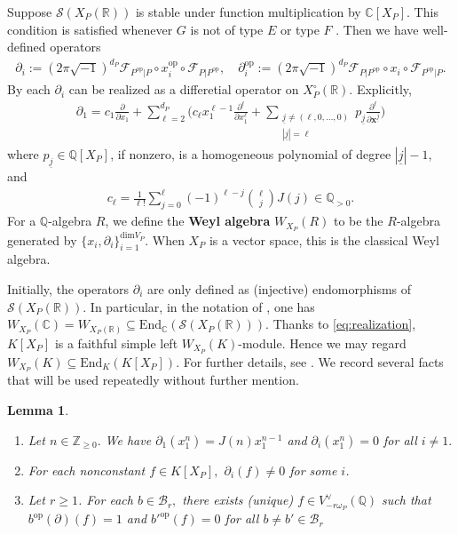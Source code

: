 \documentclass[11pt,a4paper,usenames,dvipsnames,reqno]{amsart}
\numberwithin{equation}{section}
\newcommand{\cc}{\mathbb C}
\newcommand{\zz}{\mathbb Z}
\newcommand{\qq}{\mathbb Q}
\newcommand{\rr}{\mathbb R}
\newtheorem{Lem}[Thm]{Lemma}
\theoremstyle{definition}
\theoremstyle{remark}
\begin{document}
Suppose $\mathcal{S}(X_P(\rr))$ is stable under function multiplication by $\cc[X_P].$ This condition is satisfied whenever $G$ is not of type $E$ or type $F$ \cite[Proposition 7.2]{Hsu:asymptotics}. Then we have well-defined operators
\begin{align*}
    \partial_i:=(2\pi\sqrt{-1})^{d_P}\mathcal{F}_{P^{\mathrm{op}}|P}\circ x_i^{\mathrm{op}}\circ\mathcal{F}_{P|P^{\mathrm{op}}},\quad \partial_i^{\mathrm{op}}:=(2\pi\sqrt{-1})^{d_P}\mathcal{F}_{P|P^{\mathrm{op}}}\circ x_i\circ\mathcal{F}_{P^{\mathrm{op}}|P}.
\end{align*}
By \cite[Theorem 7.8]{Hsu:asymptotics} each $\partial_i$ can be realized as a differetial operator on $X_P^\circ(\rr).$ Explicitly, 
\begin{align}\label{eq:realization}
    \partial_1=c_1\frac{\partial}{\partial x_1}+\sum_{\ell=2}^{d_P} \bigg( c_\ell x_1^{\ell-1}\frac{\partial^\ell}{\partial x_1^\ell}+\sum_{\substack{\underline{j}\neq (\ell,0,\ldots,0)\\|\underline{j}|=\ell} } p_{\underline{j}} \frac{\partial^\ell}{\partial \mathbf{x}^{\underline{j}}}\bigg)
\end{align}
where $p_{\underline{j}}\in \qq[X_P]$, if nonzero, is a homogeneous polynomial of degree $|\underline{j}|-1$, and 
\begin{align*}
    c_\ell=\frac{1}{\ell!}\sum_{j=0}^{\ell} (-1)^{\ell-j}\binom{\ell}{j}J(j)\in \qq_{>0}.
\end{align*}
For a $\qq$-algebra $R$, we define the \textbf{Weyl algebra} $W_{X_P}(R)$ to be the $R$-algebra generated by $\{x_i,\partial_i\}_{i=1}^{\mathrm{dim} V_P}$. When $X_P$ is a vector space, this is the classical Weyl algebra. 

Initially, the operators $\partial_i$ are only defined as (injective) endomorphisms of $\mathcal{S}(X_P(\rr))$. In particular, in the notation of \cite{Hsu:asymptotics}, one has $W_{X_P}(\cc)=W_{X_P(\rr)}\subseteq \mathrm{End}_\cc(\mathcal{S}(X_P(\rr)))$. Thanks to \eqref{eq:realization}, $K[X_P]$ is a faithful simple left $W_{X_P}(K)$-module. Hence we may regard $W_{X_P}(K)\subseteq \mathrm{End}_K(K[X_P])$. For further details, see \cite[\S 7.2]{Hsu:asymptotics}. We record several facts that will be used repeatedly without further mention.

\begin{Lem}
    \begin{enumerate}
        \item Let $n\in \zz_{\ge 0}.$ We have $\partial_1(x_1^n)=J(n)x_1^{n-1}$ and $\partial_i(x_1^n)=0$ for all $i\neq 1.$
        \item For each nonconstant $f\in K[X_P],$ $\partial_i(f)\neq 0$ for some $i$.
        \item Let $r\ge 1$. For each $b\in \mathcal{B}_r,$ there exists (unique) $f\in V_{-r\omega_P}^\lor(\qq)$ such that $b^{\mathrm{op}}(\partial)(f)=1$ and $b'^{\mathrm{op}}(f)=0$ for all $b\neq b'\in \mathcal{B}_r$
    \end{enumerate}
\end{Lem}
\end{document}
